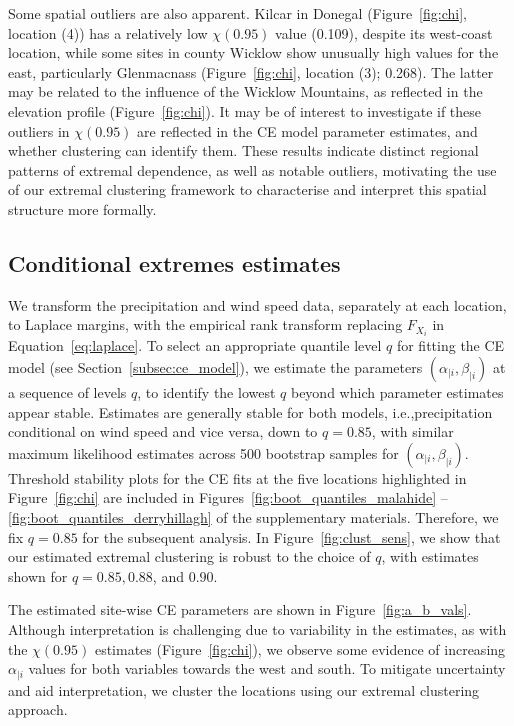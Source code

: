 \documentclass[preprint,12pt,authoryear]{elsarticle}
\begin{document}
Some spatial outliers are also apparent. 
Kilcar in Donegal (Figure~\ref{fig:chi}, location (4)) has a relatively low $\chi(0.95)$ value (0.109), despite its west-coast location, while some sites in county Wicklow show unusually high values for the east, particularly Glenmacnass (Figure~\ref{fig:chi}, location (3); 0.268).
The latter may be related to the influence of the Wicklow Mountains, as reflected in the elevation profile (Figure~\ref{fig:chi}). 
It may be of interest to investigate if these outliers in $\chi(0.95)$ are reflected in the CE model parameter estimates, and whether clustering can identify them.
These results indicate distinct regional patterns of extremal dependence, as well as notable outliers, motivating the use of our extremal clustering framework to characterise and interpret this spatial structure more formally. 

\subsection{Conditional extremes estimates}
\label{subsec:app_ce}

We transform the precipitation and wind speed data, separately at each location, to Laplace margins, with the empirical rank transform replacing $F_{X_i}$ in Equation~\eqref{eq:laplace}.
To select an appropriate quantile level $q$ for fitting the CE model (see Section~\ref{subsec:ce_model}), we estimate the parameters $(\alpha_{\mid i}, \beta_{\mid i})$ at a sequence of levels $q$, to identify the lowest $q$ beyond which parameter estimates appear stable.
Estimates are generally stable for both models, i.e.,\@ precipitation conditional on wind speed and vice versa, down to $q = 0.85$, with similar maximum likelihood estimates across 500 bootstrap samples for $(\alpha_{\mid i}, \beta_{\mid i})$.
Threshold stability plots for the CE fits at the five locations highlighted in Figure~\ref{fig:chi} are included in Figures~\ref{fig:boot_quantiles_malahide} -- \ref{fig:boot_quantiles_derryhillagh} of the supplementary materials.
Therefore, we fix $q = 0.85$ for the subsequent analysis.
In Figure~\ref{fig:clust_sens}, we show that our estimated extremal clustering is robust to the choice of $q$, with estimates shown for $q = 0.85, 0.88$, and $0.90$.

The estimated site-wise CE parameters are shown in Figure~\ref{fig:a_b_vals}.
Although interpretation is challenging due to variability in the estimates, as with the $\chi(0.95)$ estimates (Figure~\ref{fig:chi}), we observe some evidence of increasing $\alpha_{\mid i}$ values for both variables towards the west and south.
To mitigate uncertainty and aid interpretation, we cluster the locations using our extremal clustering approach. 
\end{document}
